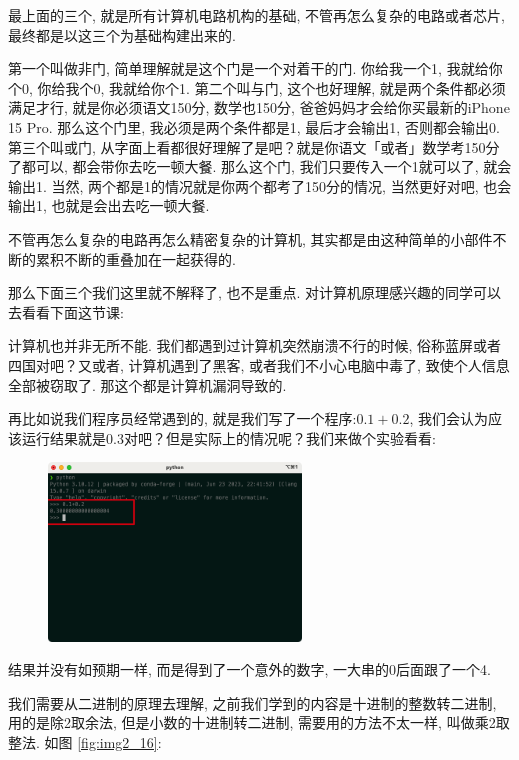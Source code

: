 最上面的三个, 就是所有计算机电路机构的基础, 不管再怎么复杂的电路或者芯片, 最终都是以这三个为基础构建出来的. 

第一个叫做非门, 简单理解就是这个门是一个对着干的门. 你给我一个1, 我就给你个0, 你给我个0, 我就给你个1. 
第二个叫与门, 这个也好理解, 就是两个条件都必须满足才行, 就是你必须语文150分, 数学也150分, 爸爸妈妈才会给你买最新的iPhone 15 Pro. 那么这个门里, 我必须是两个条件都是1, 最后才会输出1, 否则都会输出0.
第三个叫或门, 从字面上看都很好理解了是吧？就是你语文「或者」数学考150分了都可以, 都会带你去吃一顿大餐. 那么这个门, 我们只要传入一个1就可以了, 就会输出1. 当然, 两个都是1的情况就是你两个都考了150分的情况, 当然更好对吧, 也会输出1, 也就是会出去吃一顿大餐. 

不管再怎么复杂的电路再怎么精密复杂的计算机, 其实都是由这种简单的小部件不断的累积不断的重叠加在一起获得的. 

那么下面三个我们这里就不解释了, 也不是重点. 对计算机原理感兴趣的同学可以去看看下面这节课:

计算机也并非无所不能. 我们都遇到过计算机突然崩溃不行的时候, 俗称蓝屏或者四国对吧？又或者, 计算机遇到了黑客, 或者我们不小心电脑中毒了, 致使个人信息全部被窃取了. 那这个都是计算机漏洞导致的. 

再比如说我们程序员经常遇到的, 就是我们写了一个程序:$0.1+0.2$, 我们会认为应该运行结果就是$0.3$对吧？但是实际上的情况呢？我们来做个实验看看:

\begin{figure}[ht]
  \centering\includegraphics[width=0.6\textwidth]{asset/ef878802-961f-4168-9900-da12253d4b48.png}
  \caption{}
  \label{fig:img2_15}
\end{figure}

结果并没有如预期一样, 而是得到了一个意外的数字, 一大串的0后面跟了一个4.

我们需要从二进制的原理去理解, 之前我们学到的内容是十进制的整数转二进制, 用的是除2取余法, 但是小数的十进制转二进制, 需要用的方法不太一样, 叫做乘2取整法. 如图 \ref{fig:img2_16}:


